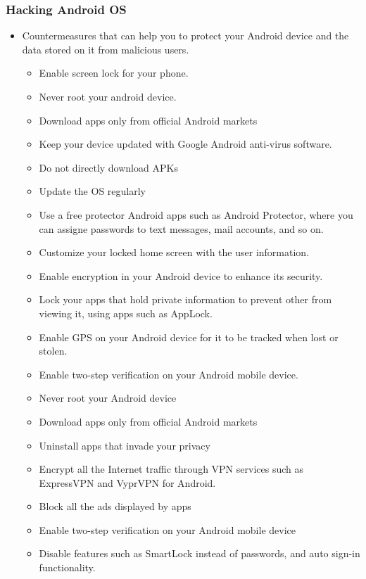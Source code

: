 \subsubsection{Hacking Android OS}
\begin{itemize}
    \item Countermeasures that can help you to protect your Android device and the data stored on it from malicious users.
    \begin{itemize}
        \item Enable screen lock for your phone.
        \item Never root your android device.
        \item Download apps only from official Android markets
        \item Keep your device updated with Google Android anti-virus software.
        \item Do not directly download APKs
        \item Update the OS regularly
        \item Use a free protector Android apps such as Android Protector, where you can assigne passwords to text messages, mail accounts, and so on.
        \item Customize your locked home screen with the user information.
        \item Enable encryption in your Android device to enhance its security.
        \item Lock your apps that hold private information to prevent other from viewing it, using apps such as AppLock.
        \item Enable GPS on your Android device for it to be tracked when lost or stolen.
        \item Enable two-step verification on your Android mobile device.
        \item Never root your Android device
        \item Download apps only from official Android markets
        \item Uninstall apps that invade your privacy
        \item Encrypt all the Internet traffic through VPN services such as ExpressVPN and VyprVPN for Android.
        \item Block all the ads displayed by apps
        \item Enable two-step verification on your Android mobile device
        \item Disable features such as SmartLock instead of passwords, and auto sign-in functionality.

\end{itemize}
\end{itemize}
